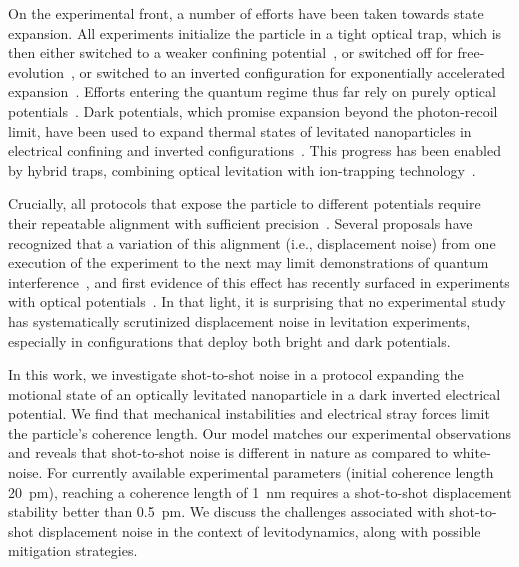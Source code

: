 \documentclass[aps,prl,reprint,twocolumn,superscriptaddress]{revtex4-2}
\begin{document}
On the experimental front, a number of efforts have been taken towards state expansion.
All experiments initialize the particle in a tight optical trap, which is then either switched to a weaker confining potential~\cite{bonvin2024state,rossi2024quantum}, or switched off for free-evolution~\cite{hebestreit2018sensing,mattana2025traptotrapfreefallsoptically,steiner2025freeexpansionchargednanoparticle,Kamba2023revealing,Kamba2025quantum}, or switched to an inverted configuration for exponentially accelerated expansion~\cite{tomassi2025accelerated,duchavn2025nanomechanical}. 
Efforts entering the quantum regime thus far rely on purely optical potentials~\cite{rossi2024quantum,Kamba2025quantum}.
%
Dark potentials, which promise expansion beyond the photon-recoil limit, have been used to expand thermal states of levitated nanoparticles  in electrical confining and inverted configurations~\cite{bonvin2024state,tomassi2025accelerated}. 
This progress has been enabled by hybrid traps, combining optical levitation with ion-trapping technology~\cite{conangla2018motion,conangla2020extending,bykov2022hybrid,bonvin2024hybrid}.

Crucially, all protocols that expose the particle to different potentials require their repeatable alignment with sufficient precision~\cite{gonzalez2021levitodynamics}. 
Several proposals have recognized that a variation of this alignment (i.e., displacement noise) from one execution of the experiment to the next may limit demonstrations of quantum interference~\cite{Pedernales2022robustPRA,rodallordes2024macroscopic,neumeier2024fast}, and first evidence of this effect has recently surfaced in experiments with optical potentials~\cite{rossi2024quantum}.
In that light, it is surprising that no experimental study has systematically scrutinized displacement noise in levitation experiments, especially in configurations that deploy both bright and dark potentials.



In this work, we investigate shot-to-shot noise in a protocol expanding the motional state of an optically levitated nanoparticle in a dark inverted electrical potential.
We find that mechanical instabilities and electrical stray forces limit the particle's coherence length. 
Our model matches our experimental observations and reveals that shot-to-shot noise is different in nature as compared to white-noise. 
For currently available experimental parameters (initial coherence length 20~pm), reaching a coherence length of 1~nm requires a shot-to-shot displacement stability better than 0.5~pm.
We discuss the challenges associated with shot-to-shot displacement noise in the context of levitodynamics, along with possible mitigation strategies.
\end{document}
